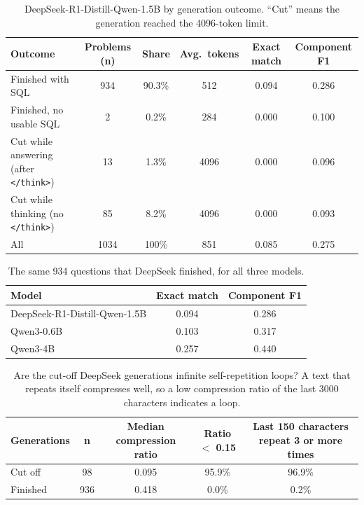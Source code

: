 \begin{table}[H]
\centering
\footnotesize
\caption{DeepSeek-R1-Distill-Qwen-1.5B by generation outcome. ``Cut'' means the generation reached the 4096-token limit.}
\label{tab:deepseek-outcome}
\begin{tabular}{lccccc}
\toprule
Outcome & Problems (n) & Share & Avg.\ tokens & Exact match & Component F1 \\
\midrule
Finished with SQL & 934 & 90.3\% & 512 & 0.094 & 0.286 \\
Finished, no usable SQL & 2 & 0.2\% & 284 & 0.000 & 0.100 \\
Cut while answering (after \texttt{</think>}) & 13 & 1.3\% & 4096 & 0.000 & 0.096 \\
Cut while thinking (no \texttt{</think>}) & 85 & 8.2\% & 4096 & 0.000 & 0.093 \\
All & 1034 & 100\% & 851 & 0.085 & 0.275 \\
\bottomrule
\end{tabular}
\end{table}

\begin{table}[H]
\centering
\footnotesize
\caption{The same 934 questions that DeepSeek finished, for all three models.}
\label{tab:deepseek-finished-934}
\begin{tabular}{lcc}
\toprule
Model & Exact match & Component F1 \\
\midrule
DeepSeek-R1-Distill-Qwen-1.5B & 0.094 & 0.286 \\
Qwen3-0.6B & 0.103 & 0.317 \\
Qwen3-4B & 0.257 & 0.440 \\
\bottomrule
\end{tabular}
\end{table}

\begin{table}[H]
\centering
\footnotesize
\caption{Are the cut-off DeepSeek generations infinite self-repetition loops? A text that repeats itself compresses well, so a low compression ratio of the last 3000 characters indicates a loop.}
\label{tab:deepseek-repetition}
\begin{tabular}{lcccc}
\toprule
Generations & n & Median compression ratio & Ratio $<$ 0.15 & Last 150 characters repeat 3 or more times \\
\midrule
Cut off & 98 & 0.095 & 95.9\% & 96.9\% \\
Finished & 936 & 0.418 & 0.0\% & 0.2\% \\
\bottomrule
\end{tabular}
\end{table}

